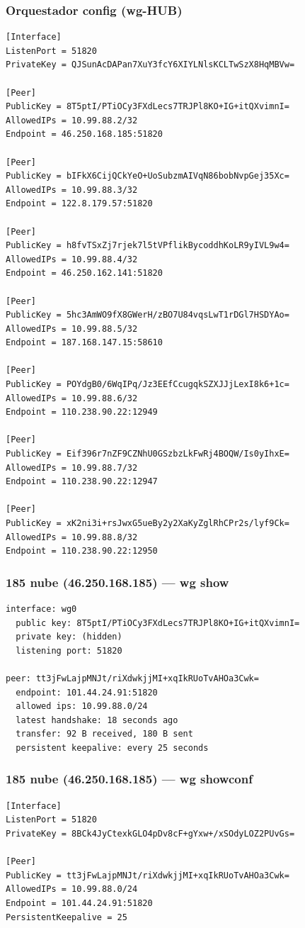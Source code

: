 \documentclass[11pt,a4paper]{article}
\begin{document}
\subsubsection*{Orquestador config (wg-HUB)}
\begin{lstlisting}
[Interface]
ListenPort = 51820
PrivateKey = QJSunAcDAPan7XuY3fcY6XIYLNlsKCLTwSzX8HqMBVw=

[Peer]
PublicKey = 8T5ptI/PTiOCy3FXdLecs7TRJPl8KO+IG+itQXvimnI=
AllowedIPs = 10.99.88.2/32
Endpoint = 46.250.168.185:51820

[Peer]
PublicKey = bIFkX6CijQCkYeO+UoSubzmAIVqN86bobNvpGej35Xc=
AllowedIPs = 10.99.88.3/32
Endpoint = 122.8.179.57:51820

[Peer]
PublicKey = h8fvTSxZj7rjek7l5tVPflikBycoddhKoLR9yIVL9w4=
AllowedIPs = 10.99.88.4/32
Endpoint = 46.250.162.141:51820

[Peer]
PublicKey = 5hc3AmWO9fX8GWerH/zBO7U84vqsLwT1rDGl7HSDYAo=
AllowedIPs = 10.99.88.5/32
Endpoint = 187.168.147.15:58610

[Peer]
PublicKey = POYdgB0/6WqIPq/Jz3EEfCcugqkSZXJJjLexI8k6+1c=
AllowedIPs = 10.99.88.6/32
Endpoint = 110.238.90.22:12949

[Peer]
PublicKey = Eif396r7nZF9CZNhU0GSzbzLkFwRj4BOQW/Is0yIhxE=
AllowedIPs = 10.99.88.7/32
Endpoint = 110.238.90.22:12947

[Peer]
PublicKey = xK2ni3i+rsJwxG5ueBy2y2XaKyZglRhCPr2s/lyf9Ck=
AllowedIPs = 10.99.88.8/32
Endpoint = 110.238.90.22:12950

\end{lstlisting}

\subsubsection*{185 nube (46.250.168.185) — wg show}
\begin{lstlisting}
interface: wg0
  public key: 8T5ptI/PTiOCy3FXdLecs7TRJPl8KO+IG+itQXvimnI=
  private key: (hidden)
  listening port: 51820

peer: tt3jFwLajpMNJt/riXdwkjjMI+xqIkRUoTvAHOa3Cwk=
  endpoint: 101.44.24.91:51820
  allowed ips: 10.99.88.0/24
  latest handshake: 18 seconds ago
  transfer: 92 B received, 180 B sent
  persistent keepalive: every 25 seconds

\end{lstlisting}

\subsubsection*{185 nube (46.250.168.185) — wg showconf}
\begin{lstlisting}
[Interface]
ListenPort = 51820
PrivateKey = 8BCk4JyCtexkGLO4pDv8cF+gYxw+/xSOdyLOZ2PUvGs=

[Peer]
PublicKey = tt3jFwLajpMNJt/riXdwkjjMI+xqIkRUoTvAHOa3Cwk=
AllowedIPs = 10.99.88.0/24
Endpoint = 101.44.24.91:51820
PersistentKeepalive = 25

\end{lstlisting}
\end{document}
